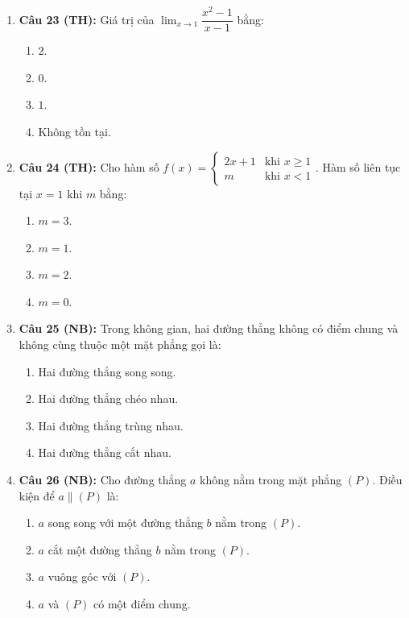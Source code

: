 \documentclass[12pt, a4paper]{article}
\begin{document}
\begin{enumerate}[leftmargin=0.8cm]
    \item \textbf{Câu 23 (TH):} Giá trị của $\lim_{x \to 1} \dfrac{x^2 - 1}{x - 1}$ bằng:
    \begin{enumerate}[label=\Alph*., leftmargin=0.8cm]
        \item $2$.
        \item $0$.
        \item $1$.
        \item Không tồn tại.
    \end{enumerate}

    \item \textbf{Câu 24 (TH):} Cho hàm số $f(x) = \begin{cases} 2x + 1 & \text{khi } x \ge 1 \\ m & \text{khi } x < 1 \end{cases}$. Hàm số liên tục tại $x = 1$ khi $m$ bằng:
    \begin{enumerate}[label=\Alph*., leftmargin=0.8cm]
        \item $m = 3$.
        \item $m = 1$.
        \item $m = 2$.
        \item $m = 0$.
    \end{enumerate}

    \item \textbf{Câu 25 (NB):} Trong không gian, hai đường thẳng không có điểm chung và không cùng thuộc một mặt phẳng gọi là:
    \begin{enumerate}[label=\Alph*., leftmargin=0.8cm]
        \item Hai đường thẳng song song.
        \item Hai đường thẳng chéo nhau.
        \item Hai đường thẳng trùng nhau.
        \item Hai đường thẳng cắt nhau.
    \end{enumerate}

    \item \textbf{Câu 26 (NB):} Cho đường thẳng $a$ không nằm trong mặt phẳng $(P)$. Điều kiện để $a \parallel (P)$ là:
    \begin{enumerate}[label=\Alph*., leftmargin=0.8cm]
        \item $a$ song song với một đường thẳng $b$ nằm trong $(P)$.
        \item $a$ cắt một đường thẳng $b$ nằm trong $(P)$.
        \item $a$ vuông góc với $(P)$.
        \item $a$ và $(P)$ có một điểm chung.
    \end{enumerate}


\end{enumerate}
\end{document}
